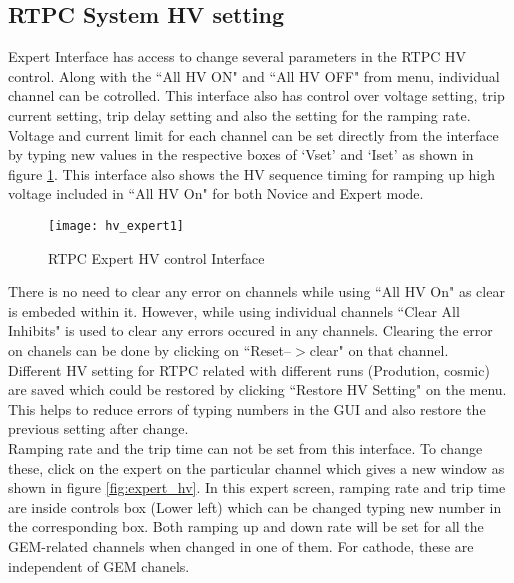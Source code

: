 \subsection{RTPC System HV setting}
\label{sub-sec:HVsetting}
Expert Interface has access to change several parameters in the RTPC HV control. Along with the ``All HV ON" and ``All HV OFF" from menu, individual channel can be cotrolled. This interface also has control over voltage setting, trip current setting, trip delay setting and also the setting for the ramping rate. Voltage and current limit for each channel can be set directly from the interface by typing new values in the respective boxes of `Vset' and `Iset' as shown in figure \ref{fig:hv_expert1}. This interface also shows the HV sequence timing for ramping up high voltage included in ``All HV On" for both Novice and Expert mode.
\iffalse
\begin{figure}[H]
	\centering
	\texttt{[image: hv\_expert0]}
	\caption{RTPC HV control Interface for Expert}
	\label{fig:hv_expert0}
\end{figure}
\fi
\begin{figure}[H]
	\centering
	\texttt{[image: hv\_expert1]}
	\caption{RTPC Expert HV control Interface}
	\label{fig:hv_expert1}
\end{figure}

There is no need to clear any error on channels while using ``All HV On" as clear is embeded within it. However, while using individual channels ``Clear All Inhibits" is used to clear any errors occured in any channels. Clearing the error on chanels can be done by clicking on ``Reset--$>$clear" on that channel.\\

Different HV setting for RTPC related with different runs (Prodution, cosmic) are saved which could be restored by clicking ``Restore HV Setting" on the menu. This helps to reduce errors of typing numbers in the GUI and also restore the previous setting after change.\\

Ramping rate and the trip time can not be set from this interface. To change these, click on the expert on the particular channel which gives a new window as shown in figure \ref{fig:expert_hv}. In this expert screen, ramping rate and trip time are inside controls box (Lower left) which can be changed typing new number in the corresponding box. Both ramping up and down rate will be set for all the GEM-related channels when changed in one of them. For cathode, these are independent of GEM chanels.

